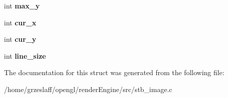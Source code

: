 \begin{DoxyCompactItemize}
\item 
\hypertarget{structstbi__gif__struct_aff3410e0fff097d4719e54096f6da69b}{int {\bfseries max\-\_\-y}}\label{structstbi__gif__struct_aff3410e0fff097d4719e54096f6da69b}

\item 
\hypertarget{structstbi__gif__struct_adbc7ae7e9ff2e2abdf66eb0e1a4b3ffb}{int {\bfseries cur\-\_\-x}}\label{structstbi__gif__struct_adbc7ae7e9ff2e2abdf66eb0e1a4b3ffb}

\item 
\hypertarget{structstbi__gif__struct_ac61865216c4b578c235f5b8170c2036c}{int {\bfseries cur\-\_\-y}}\label{structstbi__gif__struct_ac61865216c4b578c235f5b8170c2036c}

\item 
\hypertarget{structstbi__gif__struct_a5b7d7625c253025ff5ee4169afbf06b7}{int {\bfseries line\-\_\-size}}\label{structstbi__gif__struct_a5b7d7625c253025ff5ee4169afbf06b7}

\end{DoxyCompactItemize}


The documentation for this struct was generated from the following file\-:\begin{DoxyCompactItemize}
\item 
/home/grzeslaff/opengl/render\-Engine/src/stb\-\_\-image.\-c\end{DoxyCompactItemize}

